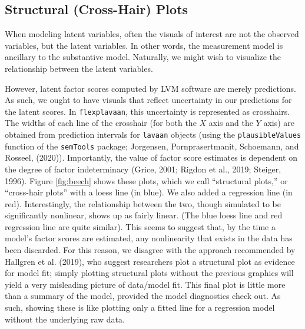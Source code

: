 \documentclass[
  english,
  man]{apa6}
\begin{document}
\hypertarget{structural-cross-hair-plots}{%
\subsection{Structural (Cross-Hair) Plots}\label{structural-cross-hair-plots}}

When modeling latent variables, often the visuals of interest are not the observed variables, but the latent variables. In other words, the measurement model is ancillary to the substantive model. Naturally, we might wish to visualize the relationship between the latent variables.

However, latent factor scores computed by LVM software are merely predictions. As such, we ought to have visuals that reflect uncertainty in our predictions for the latent scores. In \texttt{flexplavaan}, this uncertainty is represented as crosshairs. The widths of each line of the crosshair (for both the \(X\) axis and the \(Y\) axis) are obtained from prediction intervals for \texttt{lavaan} objects (using the \texttt{plausibleValues} function of the \texttt{semTools} package; Jorgensen, Pornprasertmanit, Schoemann, and Rosseel, (2020)). Importantly, the value of factor score estimates is dependent on the degree of factor indeterminacy (Grice, 2001; Rigdon et al., 2019; Steiger, 1996). Figure \ref{fig:beech} shows these plots, which we call ``structural plots,'' or ``cross-hair plots'' with a loess line (in blue). We also added a regression line (in red). Interestingly, the relationship between the two, though simulated to be significantly nonlinear, shows up as fairly linear. (The blue loess line and red regression line are quite similar). This seems to suggest that, by the time a model's factor scores are estimated, any nonlinearity that exists in the data has been discarded. For this reason, we disagree with the approach recommended by Hallgren et al. (2019), who suggest researchers plot a structural plot as evidence for model fit; simply plotting structural plots without the previous graphics will yield a very misleading picture of data/model fit. This final plot is little more than a summary of the model, provided the model diagnostics check out. As such, showing these is like plotting only a fitted line for a regression model without the underlying raw data.
\end{document}
